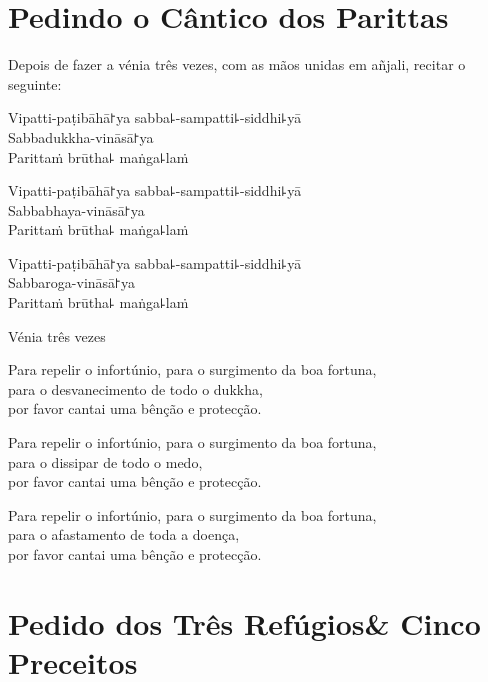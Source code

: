 \clearpage
\chapter{Pedindo o Cântico dos Parittas}

\begin{instruction}
  Depois de fazer a vénia três vezes, com as mãos unidas em añjali, recitar o seguinte:
\end{instruction}

Vipatti-paṭibāhā꜓ya sabba꜕-sampatti꜕-siddhi꜕yā\\
Sabbadukkha-vināsā꜓ya\\
Parittaṁ brūtha꜕ maṅga꜕laṁ

Vipatti-paṭibāhā꜓ya sabba꜕-sampatti꜕-siddhi꜕yā\\
Sabbabhaya-vināsā꜓ya\\
Parittaṁ brūtha꜕ maṅga꜕laṁ

Vipatti-paṭibāhā꜓ya sabba꜕-sampatti꜕-siddhi꜕yā\\
Sabbaroga-vināsā꜓ya\\
Parittaṁ brūtha꜕ maṅga꜕laṁ

\begin{instruction}
  Vénia três vezes
\end{instruction}

\begin{english}
Para repelir o infortúnio, para o surgimento da boa fortuna,\\
para o desvanecimento de todo o dukkha,\\
por favor cantai uma bênção e protecção.

Para repelir o infortúnio, para o surgimento da boa fortuna,\\
para o dissipar de todo o medo,\\
por favor cantai uma bênção e protecção.

Para repelir o infortúnio, para o surgimento da boa fortuna,\\
para o afastamento de toda a doença,\\
por favor cantai uma bênção e protecção.
\end{english}

\setlength{\englishIndent}{\leaderIndent}

\clearpage
\chapter[Três Refúgios \& Cinco Preceitos]{Pedido dos Três Refúgios\newline \& Cinco Preceitos}


